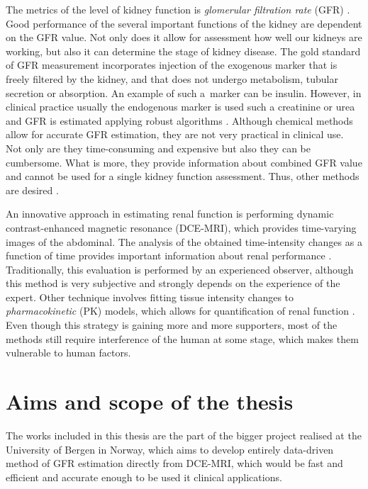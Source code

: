 The metrics of the level of kidney function is \textit{glomerular filtration rate} (GFR) \cite{traynor2006measure}. Good performance of the several important functions of the kidney are dependent on the GFR value. Not only does it allow for assessment how well our kidneys are working, but also it can determine the stage of kidney disease.
The gold standard of GFR measurement incorporates injection of the exogenous marker that is freely filtered by the kidney, and that does not undergo metabolism, tubular secretion or absorption. An example of such a~marker can be insulin.
However, in clinical practice usually the endogenous marker is used such a creatinine or urea and GFR is estimated applying robust algorithms \cite{delanaye2012measuring}.
Although chemical methods allow for accurate GFR estimation, they are not very practical in clinical use. Not only are they time-consuming and expensive but also they can be cumbersome. What is more, they provide information about combined GFR value and cannot be used for a single kidney function assessment. Thus, other methods are desired \cite{bokacheva2008assessment}.

An innovative approach in estimating renal function is performing dynamic contrast-enhanced magnetic resonance (DCE-MRI), which provides time-varying images of the abdominal.
The analysis of the obtained time-intensity changes as a function of time provides important information about renal performance \cite{bokacheva2008assessment, khalifa2014models}. Traditionally, this evaluation is performed by an experienced observer, although this method is very subjective and strongly depends on the experience of the expert. Other technique involves fitting tissue intensity changes to \textit{pharmacokinetic} (PK) models, which allows for quantification of renal function \cite{khalifa2014models}. Even though this strategy is gaining more and more supporters, most of the methods still require interference of the human at some stage, which makes them vulnerable to human factors. 

\section{Aims and scope of the thesis}
The works included in this thesis are the part of the bigger project realised at the University of Bergen in Norway, which aims to develop entirely data-driven method of GFR estimation directly from DCE-MRI, which would be fast and efficient and accurate enough to be used it clinical applications.  
 
